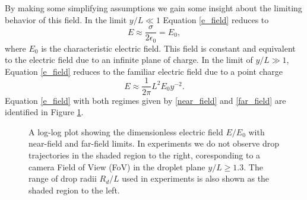 \documentclass[aip,reprint, floatfix]{revtex4-1}
\begin{document}
By making some simplifying assumptions we gain some insight about the limiting behavior of this field. In the limit $y/L \ll 1$ Equation \ref{e_field} reduces to
\begin{equation}
\label{near_field}
E \approx \frac{\sigma}{2 \epsilon_0} = E_0,
\end{equation}
where $E_0$ is the characteristic electric field. This field is constant and equivalent to the electric field due to an infinite plane of charge. In the limit of $y/L \gg 1$, Equation \ref{e_field} reduces to the familiar electric field due to a point charge
\begin{equation}
\label{far_field}
E \approx \frac{1}{2\pi}  L^2 E_0 y^{-2}.
\end{equation}
Equation \ref{e_field} with both regimes given by \ref{near_field} and \ref{far_field} are identified in Figure \ref{fig:E0}.
\begin{figure}[h]
	\centering
    \resizebox{0.5\textwidth}{!}{}
    \caption{A log-log plot showing the dimensionless electric field $E/E_0$ with near-field and far-field limits. In experiments we do not observe drop trajectories in the shaded region to the right, coresponding to a camera Field of View (FoV) in the droplet plane $y/L \geq 1.3$. The range of drop radii $R_d/L$ used in experiments is also shown as the shaded region to the left. \label{fig:E0}}
\end{figure}
\end{document}

